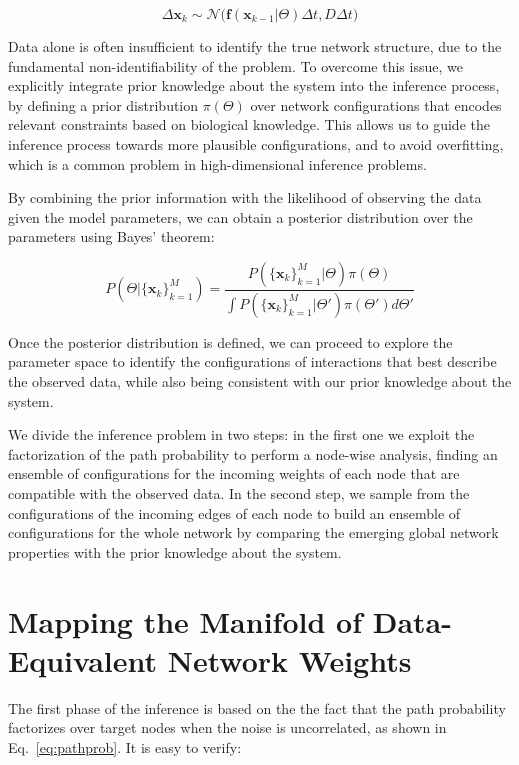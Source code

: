\documentclass[10pt, aps, rmp,  twocolumn, superscriptaddress, floatfix, showkeys]{revtex4-2}
\begin{document}
\begin{equation}
    \Delta \mathbf{x}_k \sim \mathcal{N}\Big(\mathbf{f}(\mathbf{x}_{k-1}|\Theta)\Delta t, D\Delta t\Big)
\end{equation}

Data alone is often insufficient to identify the true network structure, due to the fundamental non-identifiability of the problem. To overcome this issue, we explicitly integrate prior knowledge about the system into the inference process, by defining a prior distribution $\pi(\Theta)$ over network configurations that encodes relevant constraints based on biological knowledge. This allows us to guide the inference process towards more plausible configurations, and to avoid overfitting, which is a common problem in high-dimensional inference problems.

By combining the prior information with the likelihood of observing the data given the model parameters, we can obtain a posterior distribution over the parameters using Bayes' theorem:

\begin{equation}
    P(\Theta|\{\mathbf{x}_k\}_{k=1}^M) = \frac{P(\{\mathbf{x}_k\}_{k=1}^M|\Theta) \pi(\Theta)}{\int P(\{\mathbf{x}_k\}_{k=1}^M|\Theta') \pi(\Theta') d\Theta'}
\end{equation}

Once the posterior distribution is defined, we can proceed to explore the parameter space to identify the configurations of interactions that best describe the observed data, while also being consistent with our prior knowledge about the system. 

We divide the inference problem in two steps: in the first one we exploit the factorization of the path probability to perform a node-wise analysis, finding an ensemble of configurations for the incoming weights of each node that are compatible with the observed data. In the second step, we sample from the configurations of the incoming edges of each node to build an ensemble of configurations for the whole network by comparing the emerging global network properties with the prior knowledge about the system. 


\section{Mapping the Manifold of Data-Equivalent Network Weights}

The first phase of the inference is based on the the fact that the path probability factorizes over target nodes when the noise is uncorrelated, as shown in Eq.~\ref{eq:pathprob}. It is easy to verify:
\end{document}
